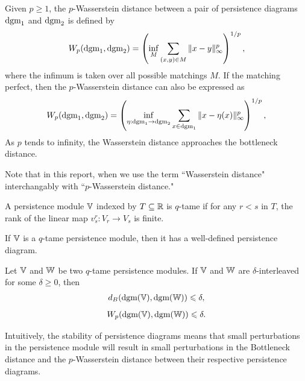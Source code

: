 \begin{defn}

Given $p\geq 1$, the $p$-Wasserstein distance between a pair of persistence diagrams $\text{dgm}_1$ and $\text{dgm}_2$ is defined by 
\begin{align}
    W_p(\text{dgm}_1, \text{dgm}_2) = \left(\inf_M \sum_{(x,y)\in M}\|x-y\|^p_\infty\right)^{1/p},
\end{align}
where the infimum is taken over all possible matchings $M$.
If the matching perfect, then the $p$-Wasserstein distance can also be expressed as 
\begin{align}
    W_p(\text{dgm}_1, \text{dgm}_2) = \left(\inf_{\eta: \text{dgm}_1 \to \text{dgm}_2} \sum_{x \in \text{dgm}_1}\|x-\eta(x)\|^p_\infty\right)^{1/p},
\end{align}
As $p$ tends to infinity, the Wasserstein distance approaches
the bottleneck distance.

Note that in this report, when we use the term ``Wasserstein distance" interchangably with ``$p$-Wasserstein distance."
\end{defn}
\begin{defn}
A persistence module $\mathbb{V}$ indexed by $T\subseteq \mathbb R$ is $q$-tame if for any $r<s$ in $T$, the rank of the linear map $v^r_s: V_r\to V_s$ is finite.
\end{defn}

\begin{thm}
If $\mathbb{V}$ is a $q$-tame persistence module, then it has a well-defined persistence diagram. 
\end{thm}

\begin{thm}
Let $\mathbb{V}$ and $\mathbb{W}$ 
be two $q$-tame persistence modules. If $\mathbb{V}$ and $\mathbb{W}$ are $\delta$-interleaved for some $\delta \geq 0$, then 
\begin{align}
    d_B(\text{dgm}(\mathbb{V}),\text{dgm}(\mathbb{W})) \leqslant \delta,
\end{align}
\begin{align}
    W_p(\text{dgm}(\mathbb{V}),\text{dgm}(\mathbb{W})) \leqslant \delta.
\end{align}
\end{thm}

Intuitively, the stability of persistence diagrams means that small perturbations in the persistence module will result in small perturbations in the Bottleneck distance and the $p$-Wasserstein distance between their respective persistence diagrams.

